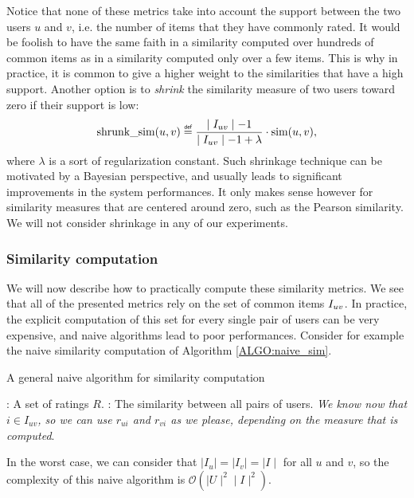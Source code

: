 Notice that none of these metrics take into account the support between the two
users $u$ and $v$, i.e. the number of items that they have commonly rated. It
would be foolish to have the same faith in a similarity computed over hundreds
of common items as in a similarity computed only over a few items. This is why
in practice, it is common to give a higher weight to the similarities that have
a high support. Another option is to \textit{shrink} the similarity measure of
two users toward zero if their support is low:
$$\text{shrunk\_sim}(u, v) \eqdef \frac{\mid \Iuv \mid - 1}{\mid \Iuv \mid - 1
+ \lambda} \cdot \ssim(u, v),$$
where $\lambda$ is a sort of regularization constant. Such shrinkage technique
can be motivated by a Bayesian perspective, and usually leads to significant
improvements in the system performances. It only makes sense however for
similarity measures that are centered around zero, such as the Pearson
similarity. We will not consider shrinkage in any of our experiments.

\subsubsection{Similarity computation}

We will now describe how to practically compute these similarity metrics. We
see that all of the presented metrics rely on the set of common items $I_{uv}$.
In practice, the explicit computation of this set for every single pair of
users can be very expensive, and naive algorithms lead to poor performances.
Consider for example the naive similarity computation of Algorithm
\ref{ALGO:naive_sim}.
\begin{algorithm}[!ht]
 \caption{A general naive algorithm for similarity computation}
       \label{ALGO:naive_sim}
       \begin{algorithmic}

         : A set of ratings $R$.
         : The similarity between all pairs of users.
         \STATE \textit{We know now that $i \in I_{uv}$, so we can use $r_{ui}$
         and $r_{vi}$ as we please, depending on the measure that is computed}.
         \ENDIF
        \ENDFOR
        \ENDFOR
        \ENDFOR
\end{algorithmic}
\end{algorithm}
In the worst case, we can consider that $\mid I_u \mid = \mid I_v \mid = \mid I
\mid$ for all $u$ and $v$, so the complexity of this naive algorithm is
$\mathcal{O}(\mid U \mid^2 \mid I \mid^2)$.

